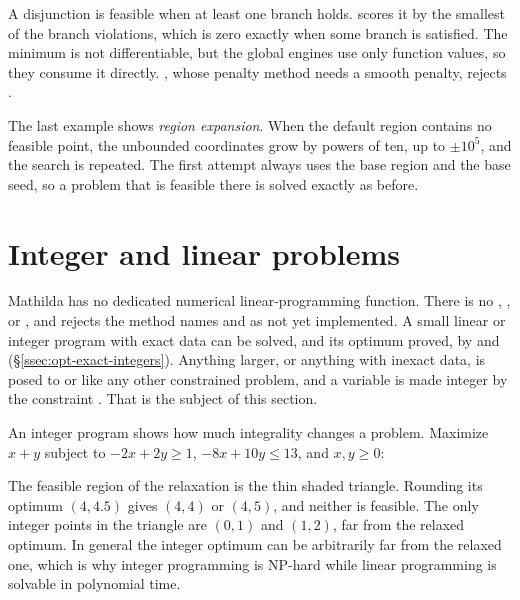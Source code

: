 A disjunction  is feasible when at least one branch holds.
 scores it by the smallest of the branch violations, which is zero
exactly when some branch is satisfied. The minimum is not differentiable, but
the global engines use only function values, so they consume it directly.
, whose penalty method needs a smooth penalty, rejects .

The last example shows \emph{region expansion}. When the
default region contains no feasible point, the unbounded coordinates grow by
powers of ten, up to \(\pm10^5\), and the search is repeated. The first attempt
always uses the base region and the base seed, so a problem that is feasible
there is solved exactly as before.

\section{Integer and linear problems}
\label{sec:opt-integer}

Mathilda has no dedicated numerical linear-programming function. There is no
, , or
, and  rejects the method
names  and  as not yet
implemented. A small linear or integer program with exact data can be solved,
and its optimum proved, by  and 
(\S\ref{ssec:opt-exact-integers}). Anything larger, or anything with inexact
data, is posed to  or  like any other constrained
problem, and a variable is made integer by the constraint
. That is the subject of this section.

An integer program shows how much integrality changes a problem. Maximize \(x + y\)
subject to \(-2x + 2y \ge 1\), \(-8x + 10y \le 13\), and \(x, y \ge 0\):

\begin{codepairs}
\end{codepairs}


The feasible region of the relaxation is the thin shaded triangle. Rounding its
optimum \((4, 4.5)\) gives \((4, 4)\) or \((4, 5)\), and neither is feasible.
The only integer points in the triangle are \((0,1)\) and \((1,2)\), far from the
relaxed optimum. In general the integer optimum can be arbitrarily far from the
relaxed one, which is why integer programming is NP-hard while linear
programming is solvable in polynomial time.

